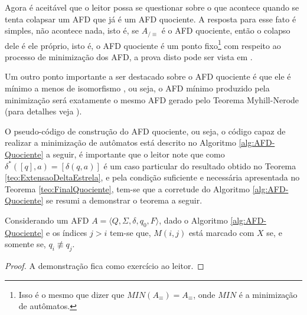 Agora é aceitável que o leitor possa se questionar sobre o que acontece quando se tenta colapsar um AFD que já é um AFD quociente. A resposta para esse fato é simples, não acontece nada, isto é, se $A_{/\equiv}$ é o AFD quociente, então o colapso dele é ele próprio, isto é, o AFD quociente é um ponto fixo\footnote{Isso é o mesmo que dizer que $MIN(A_\equiv) = A_\equiv$, onde $MIN$ é a minimização de autômatos.} com respeito ao processo de minimização dos AFD, a prova disto pode ser vista em \cite{martin2003}. 

Um outro ponto importante a ser destacado sobre o AFD quociente é que ele é mínimo a menos de isomorfismo \cite{martin2003}, ou seja, o AFD mínimo produzido pela minimização será exatamente o mesmo AFD gerado pelo Teorema Myhill-Nerode (para detalhes veja  \cite{martin2003}).

O  pseudo-código  de construção do AFD quociente, ou seja, o código capaz de realizar a minimização de autômatos está descrito no Algoritmo \ref{alg:AFD-Quociente} a seguir, é importante que o leitor note que como $\delta^*([q], a) = [\delta(q, a)]$ é um caso particular do resultado obtido no Teorema \ref{teo:ExtensaoDeltaEstrela}, e pela condição suficiente e necessária apresentada no Teorema \ref{teo:FinalQuociente}, tem-se que a corretude do Algoritmo \ref{alg:AFD-Quociente} se resumi a demonstrar o teorema a seguir.

\begin{theorem}
	Considerando um AFD $A = \langle Q, \Sigma, \delta, q_0, F\rangle$, dado o Algoritmo \ref{alg:AFD-Quociente} e os índices $j > i$ tem-se que,  $M(i, j)$ está marcado com $X$ se, e somente se, $q_i \not\equiv q_j$.
\end{theorem}

\begin{proof}
	A demonstração fica como exercício ao leitor.
\end{proof}

